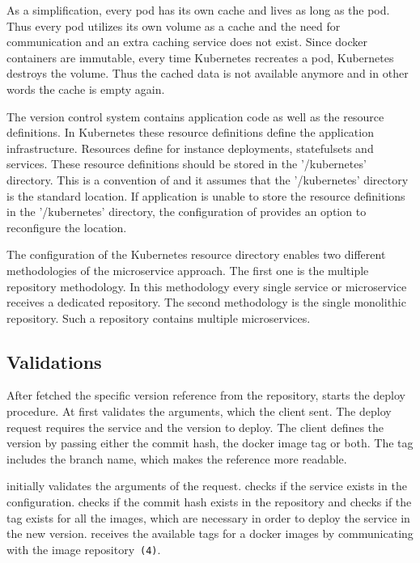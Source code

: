 As a simplification, every pod has its own cache and lives as long as the pod. Thus every
pod utilizes its own volume as a cache and the need for communication and an extra caching
service does not exist. Since docker containers are immutable, every time Kubernetes
recreates a pod, Kubernetes destroys the volume. Thus the cached data is not available
anymore and in other words the cache is empty again.

The version control system contains application code as well as the resource
definitions. In Kubernetes these resource definitions define the application
infrastructure. Resources define for instance deployments, statefulsets and
services. These resource definitions should be stored in the '/kubernetes' directory. This
is a convention of \deployer and it assumes that the '/kubernetes' directory is the
standard location. If application is unable to store the resource definitions in the
'/kubernetes' directory, the configuration of \deployer provides an option to reconfigure
the location.

The configuration of the Kubernetes resource directory enables two different methodologies
of the microservice approach. The first one is the multiple repository methodology. In
this methodology every single service or microservice receives a dedicated repository.
The second methodology is the single monolithic repository. Such a repository contains
multiple microservices.

\subsection{Validations}

After \deployer fetched the specific version reference from the repository, \deployer starts
the deploy procedure. At first \deployer validates the arguments, which the client
sent. The deploy request requires the service and the version to deploy. The client
defines the version by passing either the commit hash, the docker image tag or both. The
tag includes the branch name, which makes the reference more readable.

\deployer initially validates the arguments of the request. \deployer checks if the service
exists in the configuration. \deployer checks if the commit hash exists in the repository
and \deployer checks if the tag exists for all the images, which are necessary in order to
deploy the service in the new version. \deployer receives the available tags for a docker
images by communicating with the image repository~\texttt{(4)}.

